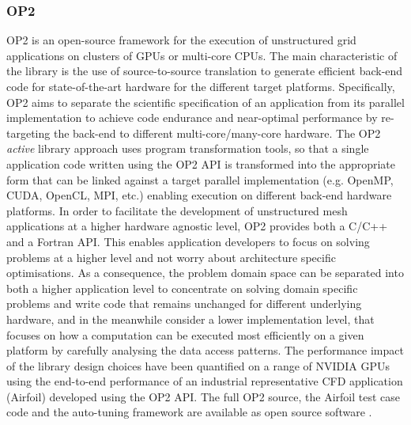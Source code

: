 \subsubsection{OP2}
  OP2 \cite{Giles20131451} is an open-source framework for the
  execution of unstructured grid applications on clusters of GPUs or
  multi-core CPUs. The main characteristic of the library is the use
  of source-to-source translation to generate efficient back-end code
  for state-of-the-art hardware for the different target
  platforms. Specifically, OP2 aims to separate the scientific
  specification of an application from its parallel implementation to
  achieve code endurance and near-optimal performance by re-targeting
  the back-end to different multi-core/many-core hardware. The OP2
  \emph{active} library approach uses program transformation tools, so
  that a single application code written using the OP2 API is
  transformed into the appropriate form that can be linked against a
  target parallel implementation (e.g. OpenMP, CUDA, OpenCL, MPI,
  etc.) enabling execution on different back-end hardware
  platforms. In order to facilitate the development of unstructured
  mesh applications at a higher hardware agnostic level, OP2 provides
  both a C/C++ and a Fortran API. This enables application developers
  to focus on solving problems at a higher level and not worry about
  architecture specific optimisations. As a consequence, the problem
  domain space can be separated into both a higher application level
  to concentrate on solving domain specific problems and write code
  that remains unchanged for different underlying hardware, and in the
  meanwhile consider a lower implementation level, that focuses on how
  a computation can be executed most efficiently on a given platform
  by carefully analysing the data access patterns.  The performance
  impact of the library design choices have been quantified on a range
  of NVIDIA GPUs using the end-to-end performance of an industrial
  representative CFD application (Airfoil) developed using the OP2
  API. The full OP2 source, the Airfoil test case code and the
  auto-tuning framework are available as open source software
  \cite{OP2Web}.
